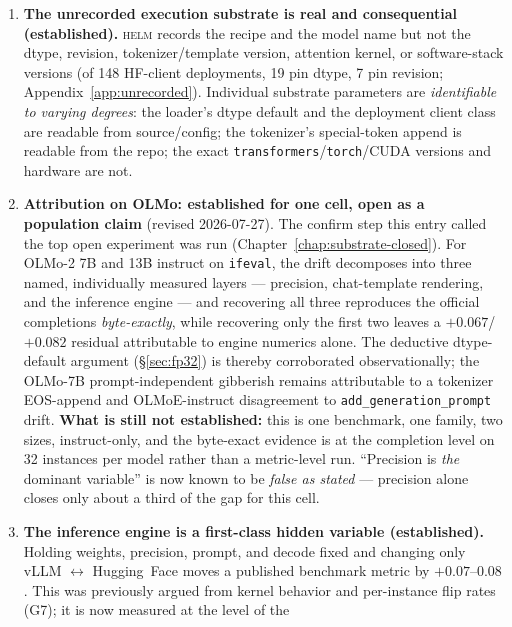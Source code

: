 \documentclass[11pt]{report}
\newcommand{\code}[1]{\texttt{#1}}
\begin{document}
\begin{enumerate}
  \item \textbf{The unrecorded execution substrate is real and consequential
        (established).} \textsc{helm} records the recipe and the model name but not
        the dtype, revision, tokenizer/template version, attention kernel, or
        software-stack versions (of 148 HF-client deployments, 19 pin dtype, 7 pin
        revision; Appendix~\ref{app:unrecorded}). Individual substrate parameters are
        \emph{identifiable to varying degrees}: the loader's dtype default and the
        deployment client class are readable from source/config; the tokenizer's
        special-token append is readable from the repo; the exact
        \code{transformers}/\code{torch}/CUDA versions and hardware are not.
  \item \textbf{Attribution on OLMo: established for one cell, open as a population
        claim} (revised 2026-07-27). The confirm step this entry called the top open
        experiment was run (Chapter~\ref{chap:substrate-closed}). For OLMo-2 7B and
        13B instruct on \code{ifeval}, the drift decomposes into three named,
        individually measured layers --- precision, chat-template rendering, and the
        inference engine --- and recovering all three reproduces the official
        completions \emph{byte-exactly}, while recovering only the first two leaves a
        $+0.067$/$+0.082$ residual attributable to engine numerics alone. The
        deductive dtype-default argument (\S\ref{sec:fp32}) is thereby corroborated
        observationally; the OLMo-7B prompt-independent gibberish remains attributable
        to a tokenizer EOS-append and OLMoE-instruct disagreement to
        \code{add\_generation\_prompt} drift. \textbf{What is still not established:}
        this is one benchmark, one family, two sizes, instruct-only, and the
        byte-exact evidence is at the completion level on 32 instances per model
        rather than a metric-level run. ``Precision is \emph{the} dominant variable''
        is now known to be \emph{false as stated} --- precision alone closes only
        about a third of the gap for this cell.
  \item \textbf{The inference engine is a first-class hidden variable
        (established).} Holding weights, precision, prompt, and decode fixed and
        changing only vLLM $\leftrightarrow$ Hugging~Face moves a published benchmark
        metric by $+0.07$--$0.08$. This was previously argued from kernel behavior
        and per-instance flip rates (G7); it is now measured at the level of the

\end{enumerate}
\end{document}
